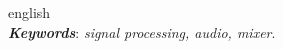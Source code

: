 \begin{resumo}[Abstract]
\begin{otherlanguage*}{english}
    \\
    \textbf{\textit{Keywords}}: \textit{signal processing, audio, mixer}.
  \end{otherlanguage*}
 \end{resumo}
 